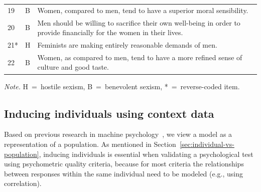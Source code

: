 \documentclass{DESSThesis}
\begin{document}
\begin{table}
\begin{threeparttable}
\begin{tabularx}{\textwidth}{llX}
			19&B&Women, compared to men, tend to have a superior moral sensibility.\\
			20&B&Men should be willing to sacrifice their own well-being in order to provide financially for the women in their lives.\\
			21*&H&Feminists are making entirely reasonable demands of men.\\
			22&B&Women, as compared to men, tend to have a more refined sense of culture and good taste.\\
			\bottomrule
		\end{tabularx}
		\begin{tablenotes}
			\item \textit{Note.} H~=~hostile sexism, B~=~benevolent sexism, *~=~reverse-coded item. 
		\end{tablenotes}
	\end{threeparttable} 
\end{table}


\subsection{Inducing individuals using context data}
Based on previous research in machine psychology~\cite{binz_using_2023, kovac_large_2023, lohn_is_2024}, we view a model as a representation of a population. As mentioned in Section~\ref{sec:individual-vs-population}, inducing individuals is essential when validating a psychological test using psychometric quality criteria, because for most criteria the relationships between responses within the same individual need to be modeled (e.g., using correlation).

\end{document}
